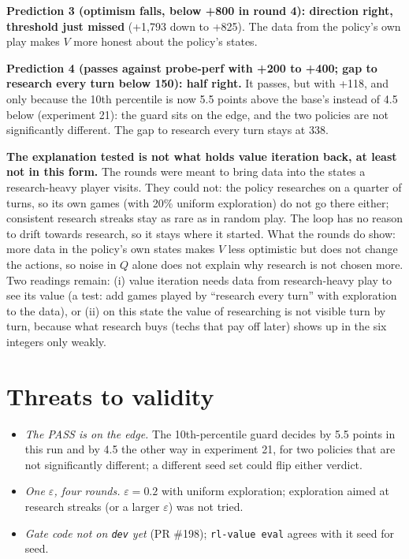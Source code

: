 \documentclass{../polyexp}
\begin{document}
\textbf{Prediction 3 (optimism falls, below +800 in round 4): direction right, threshold just missed} (+1{,}793
down to +825). The data from the policy's own play makes $V$ more honest about the policy's states.

\textbf{Prediction 4 (passes against probe-perf with +200 to +400; gap to research every turn below 150): half
right.} It passes, but with +118, and only because the 10th percentile is now 5.5 points above the base's instead of
4.5 below (experiment 21): the guard sits on the edge, and the two policies are not significantly different. The gap
to research every turn stays at 338.

\textbf{The explanation tested is not what holds value iteration back, at least not in this form.} The rounds were
meant to bring data into the states a research-heavy player visits. They could not: the policy researches on a
quarter of turns, so its own games (with 20\% uniform exploration) do not go there either; consistent research
streaks stay as rare as in random play. The loop has no reason to drift towards research, so it stays where it
started. What the rounds do show: more data in the policy's own states makes $V$ less optimistic but does not
change the actions, so noise in $Q$ alone does not explain why research is not chosen more. Two readings remain:
(i) value iteration needs data from research-heavy play to see its value (a test: add games played by ``research
every turn'' with exploration to the data), or (ii) on this state the value of researching is not visible turn by
turn, because what research buys (techs that pay off later) shows up in the six integers only weakly.


\section{Threats to validity}
\begin{itemize}
  \item \emph{The PASS is on the edge.} The 10th-percentile guard decides by 5.5 points in this run and by 4.5 the
        other way in experiment 21, for two policies that are not significantly different; a different seed set
        could flip either verdict.
  \item \emph{One $\varepsilon$, four rounds.} $\varepsilon = 0.2$ with uniform exploration; exploration aimed at
        research streaks (or a larger $\varepsilon$) was not tried.
  \item \emph{Gate code not on \texttt{dev} yet} (PR \#198); \texttt{rl-value eval} agrees with it seed for seed.
\end{itemize}
\end{document}
